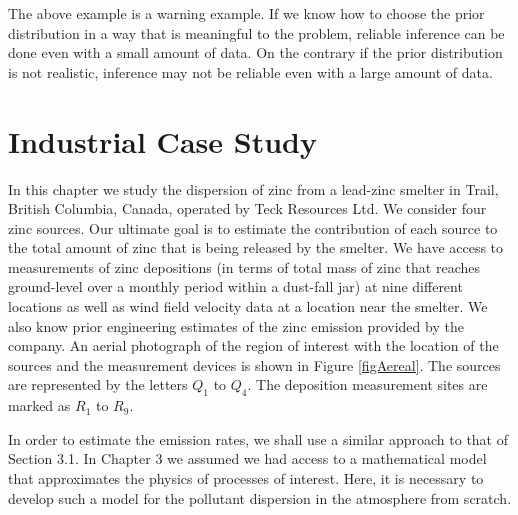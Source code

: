 \documentclass{sfuthesis}
\begin{document}
The above example is a warning example. If we know how to choose the prior distribution in a way that is meaningful to the
problem, reliable inference can be done even with a small amount of data. On the contrary if the prior distribution
is not realistic, inference   may not be reliable even with a large amount of data.  
\newpage




\chapter{Industrial Case  Study}



In this chapter we study
the dispersion of zinc from a lead-zinc smelter in Trail, British Columbia, Canada,
operated by Teck Resources Ltd.  We consider four zinc sources. Our ultimate goal
is to estimate the contribution of each source  to the total amount of zinc
that is being released by the smelter. We have access to
measurements of  zinc depositions (in terms of total mass of zinc that reaches ground-level over a monthly period within a dust-fall jar) at nine different locations as well as wind field velocity data 
at a location near the smelter. We also know prior engineering estimates of the zinc emission 
provided by the company.
An aerial photograph of the region  of interest with 
the location of the sources and the measurement devices is shown 
in Figure \ref{figAereal}. The sources are represented by the letters
$Q_{1}$ to $Q_{4}$. The  deposition measurement sites are marked
as $R_{1}$ to $R_{9}$. 

In order to  estimate the emission rates, we shall use a similar approach to that of Section 3.1.
In Chapter 3 we assumed  we had access to  a mathematical model that approximates
the physics of processes of interest. Here, it is necessary to develop such a
 model for the pollutant dispersion in the
atmosphere from scratch.
\end{document}
